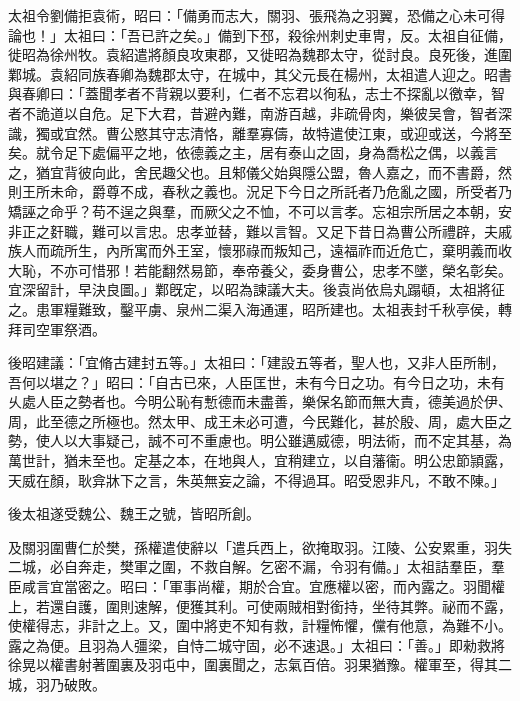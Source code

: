 \begin{pinyinscope}
 
 
 
 太祖令劉備拒袁術，昭曰：「備勇而志大，關羽、張飛為之羽翼，恐備之心未可得論也！」太祖曰：「吾已許之矣。」備到下邳，殺徐州刺史車冑，反。太祖自征備，徙昭為徐州牧。袁紹遣將顏良攻東郡，又徙昭為魏郡太守，從討良。良死後，進圍鄴城。袁紹同族春卿為魏郡太守，在城中，其父元長在楊州，太祖遣人迎之。昭書與春卿曰：「蓋聞孝者不背親以要利，仁者不忘君以徇私，志士不探亂以徼幸，智者不詭道以自危。足下大君，昔避內難，南游百越，非疏骨肉，樂彼吴會，智者深識，獨或宜然。曹公愍其守志清恪，離羣寡儔，故特遣使江東，或迎或送，今將至矣。就令足下處偏平之地，依德義之主，居有泰山之固，身為喬松之偶，以義言之，猶宜背彼向此，舍民趣父也。且邾儀父始與隱公盟，魯人嘉之，而不書爵，然則王所未命，爵尊不成，春秋之義也。況足下今日之所託者乃危亂之國，所受者乃矯誣之命乎？苟不逞之與羣，而厥父之不恤，不可以言孝。忘祖宗所居之本朝，安非正之姧職，難可以言忠。忠孝並替，難以言智。又足下昔日為曹公所禮辟，夫戚族人而疏所生，內所寓而外王室，懷邪祿而叛知己，遠福祚而近危亡，棄明義而收大恥，不亦可惜邪！若能翻然易節，奉帝養父，委身曹公，忠孝不墜，榮名彰矣。宜深留計，早決良圖。」鄴旣定，以昭為諫議大夫。後袁尚依烏丸蹋頓，太祖將征之。患軍糧難致，鑿平虜、泉州二渠入海通運，昭所建也。太祖表封千秋亭侯，轉拜司空軍祭酒。
 
 
 
 
 後昭建議：「宜脩古建封五等。」太祖曰：「建設五等者，聖人也，又非人臣所制，吾何以堪之？」昭曰：「自古已來，人臣匡世，未有今日之功。有今日之功，未有乆處人臣之勢者也。今明公恥有慙德而未盡善，樂保名節而無大責，德美過於伊、周，此至德之所極也。然太甲、成王未必可遭，今民難化，甚於殷、周，處大臣之勢，使人以大事疑己，誠不可不重慮也。明公雖邁威德，明法術，而不定其基，為萬世計，猶未至也。定基之本，在地與人，宜稍建立，以自藩衞。明公忠節頴露，天威在顏，耿弇牀下之言，朱英無妄之論，不得過耳。昭受恩非凡，不敢不陳。」
 
 
 後太祖遂受魏公、魏王之號，皆昭所創。
 
 
 
 
 及關羽圍曹仁於樊，孫權遣使辭以「遣兵西上，欲掩取羽。江陵、公安累重，羽失二城，必自奔走，樊軍之圍，不救自解。乞密不漏，令羽有備。」太祖詰羣臣，羣臣咸言宜當密之。昭曰：「軍事尚權，期於合宜。宜應權以密，而內露之。羽聞權上，若還自護，圍則速解，便獲其利。可使兩賊相對銜持，坐待其弊。祕而不露，使權得志，非計之上。又，圍中將吏不知有救，計糧怖懼，儻有他意，為難不小。露之為便。且羽為人彊梁，自恃二城守固，必不速退。」太祖曰：「善。」即勑救將徐晃以權書射著圍裏及羽屯中，圍裏聞之，志氣百倍。羽果猶豫。權軍至，得其二城，羽乃破敗。
 

\end{pinyinscope}
